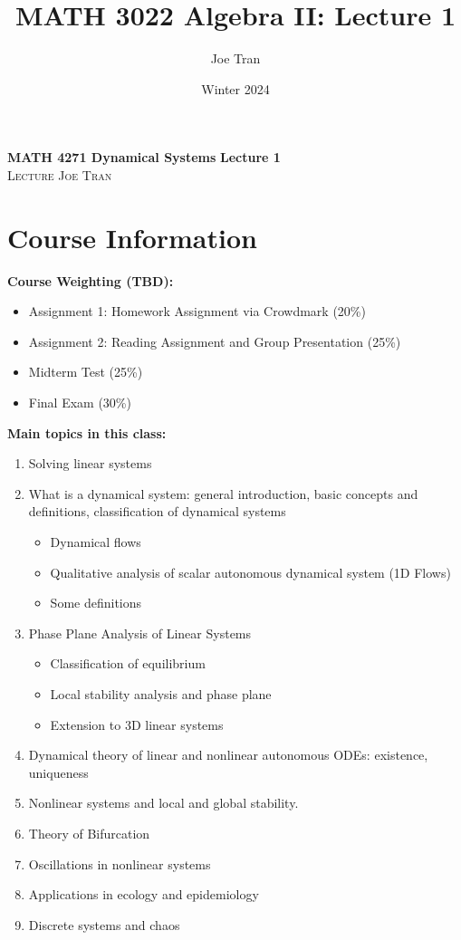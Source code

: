 \documentclass[11pt]{amsart}
\title{MATH 3022 Algebra II: Lecture 1}
\author{Joe Tran}
\date{Winter 2024}
\theoremstyle{definition}\newtheorem{definition}{Definition}
\theoremstyle{definition}\newtheorem{notation}{Notation}
\theoremstyle{definition}\newtheorem{example}{Example}
\theoremstyle{theorem}\newtheorem{theorem}{Theorem}
\theoremstyle{theorem}\newtheorem{corollary}{Corollary}
\theoremstyle{theorem}\newtheorem{proposition}{Proposition}
\theoremstyle{theorem}\newtheorem{lemma}{Lemma}
\theoremstyle{theorem}\newtheorem{question}{Question}
\theoremstyle{remark}\newtheorem{remark}{Remark}
\begin{document}
\textbf{MATH 4271 Dynamical Systems} \hfill \textbf{Lecture 1} \\
\textsc{Lecture} \hfill \textsc{Joe Tran}

\section{Course Information}

\textbf{Course Weighting (TBD):}
\begin{itemize}
    \item Assignment 1: Homework Assignment via Crowdmark (20\%)
    \item Assignment 2: Reading Assignment and Group Presentation (25\%)
    \item Midterm Test (25\%)
    \item Final Exam (30\%)
\end{itemize}

\textbf{Main topics in this class:}
\begin{enumerate}
    \item Solving linear systems
    \item What is a dynamical system: general introduction, basic concepts and definitions, classification of dynamical systems
    \begin{itemize}
        \item Dynamical flows
        \item Qualitative analysis of scalar autonomous dynamical system (1D Flows)
        \item Some definitions
    \end{itemize}
    \item Phase Plane Analysis of Linear Systems
    \begin{itemize}
        \item Classification of equilibrium
        \item Local stability analysis and phase plane
        \item Extension to 3D linear systems
    \end{itemize}
    \item Dynamical theory of linear and nonlinear autonomous ODEs: existence, uniqueness
    \item Nonlinear systems and local and global stability.
    \item Theory of Bifurcation
    \item Oscillations in nonlinear systems
    \item Applications in ecology and epidemiology
    \item Discrete systems and chaos
\end{enumerate}
\end{document}
